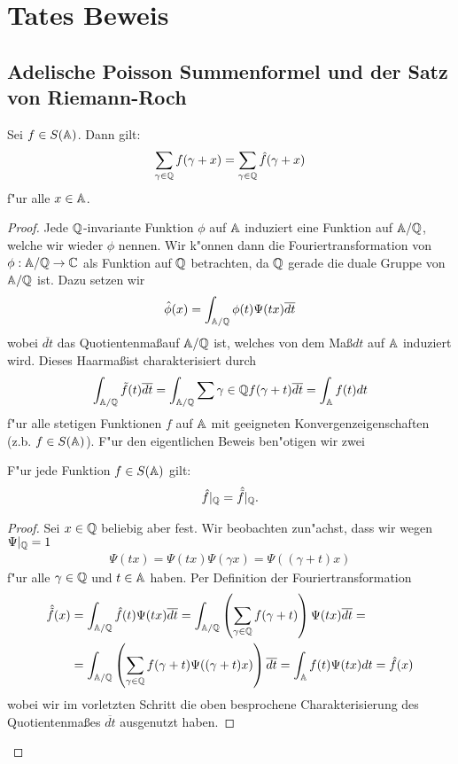 \section{Tates Beweis}
\subsection{Adelische Poisson Summenformel und der Satz von Riemann-Roch}
	\begin{satz}\label{satz:adelic-poisson}
		Sei $f \in S(\mathbb{A})$. Dann gilt:
		\begin{align}
			\sum_{\gamma \in \mathbb{Q}} {f(\gamma + x)} = \sum_{\gamma \in \mathbb{Q}}{\hat{f}(\gamma + x)}
		\end{align}
		f"ur alle $x \in \mathbb{A}$.
	\end{satz}
	\begin{proof}
		Jede $\mathbb{Q}$-invariante Funktion $\phi$ auf $\mathbb{A}$ induziert eine Funktion auf $\mathbb{A}/\mathbb{Q}$, welche wir wieder $\phi$ nennen.
		Wir k"onnen dann die Fouriertransformation von $\phi: \mathbb{A}/\mathbb{Q} \rightarrow \mathbb{C}$ als Funktion auf $\mathbb{Q}$ betrachten, da $\mathbb{Q}$ gerade die duale Gruppe von $\mathbb{A}/\mathbb{Q}$ ist. Dazu setzen wir
		\begin{align*}
			\hat{\phi}(x) = \int_{\mathbb{A}/\mathbb{Q}}\phi(t)\Psi(tx)\overline{dt}
		\end{align*}
		wobei $\overline{dt}$ das Quotientenma\ss auf $\mathbb{A}/\mathbb{Q}$ ist, welches von dem Ma\ss $dt$ auf $\mathbb{A}$ induziert wird. Dieses Haarma\ss ist charakterisiert durch
		\begin{align*}
			\int_{\mathbb{A}/\mathbb{Q}}\tilde{f}(t)\overline{dt} =
			\int_{\mathbb{A}/\mathbb{Q}}\sum{\gamma \in \mathbb{Q}}f(\gamma+t)\overline{dt} =
			\int_{\mathbb{A}} f(t)dt
		\end{align*}
		f"ur alle stetigen Funktionen $f$ auf $\mathbb{A}$ mit geeigneten Konvergenzeigenschaften (z.b. $f\in S(\mathbb{A})$). F"ur den eigentlichen Beweis ben"otigen wir zwei
		
		\begin{lemma}
			F"ur jede Funktion $f \in S(\mathbb{A})$ gilt:
			\begin{align*}
				\hat{f}|_{\mathbb{Q}} = \hat{\tilde{f}}|_{\mathbb{Q}}.
			\end{align*}
		\end{lemma}
		\begin{proof}
			Sei $x \in \mathbb{Q}$ beliebig aber fest. Wir beobachten zun"achst, dass wir wegen $\Psi|_{\mathbb{Q}} =1$
			\begin{align*}
				\Psi(tx)= \Psi(tx)\Psi(\gamma x)=\Psi((\gamma + t) x)
			\end{align*}
			f"ur alle $\gamma \in \mathbb{Q}$ und $t\in \mathbb{A}$ haben. Per Definition der Fouriertransformation
			\begin{align*}
				\hat{\tilde{f}}(x)	&= \int_{\mathbb{A} / \mathbb{Q}} {\hat{f}(t)\Psi(tx)\overline{dt}} 
									 = \int_{\mathbb{A} / \mathbb{Q}} \left(\sum_{\gamma \in \mathbb{Q}}{f(\gamma + t)}\right)\Psi(tx)\overline{dt} =\\
									&= \int_{\mathbb{A} / \mathbb{Q}} \left(\sum_{\gamma \in \mathbb{Q}}{f(\gamma + t)}\Psi((\gamma + t)x)\right)\overline{dt}
									 = \int_{\mathbb{A}} f(t)\Psi(tx)dt = \hat{f}(x)
			\end{align*}
			wobei wir im vorletzten Schritt die oben besprochene Charakterisierung des Quotientenmaßes $\overline{dt}$ ausgenutzt haben.
		\end{proof}
		

\end{proof}

